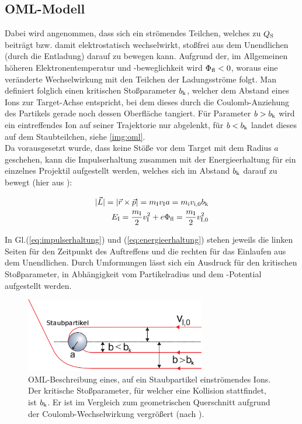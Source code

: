     \subsection{OML-Modell}\label{subsub:oml}

    Dabei wird angenommen, dass sich ein strömendes Teilchen, welches zu $Q_\text{S}$ beiträgt bzw. damit elektrostatisch wechselwirkt, stoßfrei aus dem Unendlichen (durch die Entladung) darauf zu bewegen kann. Aufgrund der, im Allgemeinen höheren Elektronentemperatur und -beweglichkeit wird $\Phi_\text{fl}<0$, woraus eine veränderte Wechselwirkung mit den Teilchen der Ladungsströme folgt. Man definiert folglich einen kritischen Stoßparameter $b_\text{k}$, welcher dem Abstand eines Ions zur Target-Achse entspricht, bei dem dieses durch die Coulomb-Anziehung des Partikels gerade noch dessen Oberfläche tangiert. Für Parameter $b>b_\text{k}$ wird ein eintreffendes Ion auf seiner Trajektorie nur abgelenkt, für $b<b_\text{k}$ landet dieses auf dem Staubteilchen, siehe \autoref{img:oml}.\\
    Da vorausgesetzt wurde, dass keine Stöße vor dem Target mit dem Radius $a$ geschehen, kann die Impulserhaltung zusammen mit der Energieerhaltung für ein einzelnes Projektil aufgestellt werden, welches sich im Abstand $b_\text{k}$ darauf zu bewegt (hier aus \cite{Melzer12}):

      \begin{align}
        |\vec{L}|=|\vec{r}\times\vec{p}|=m_\text{I}v_\text{I}a=m_\text{i}v_\text{i,0}b_\text{k} \label{eq:impulserhaltung} \\
        E_\text{I}=\frac{m_\text{I}}{2}v_\text{I}^2+e\Phi_\text{fl}=\frac{m_\text{I}}{2}v_\text{I,0}^2 \label{eq:energieerhaltung}
      \end{align}

    In Gl.(\ref{eq:impulserhaltung}) und (\ref{eq:energieerhaltung}) stehen jeweils die linken Seiten für den Zeitpunkt des Auftreffens und die rechten für das Einlaufen aus dem Unendlichen. Durch Umformungen lässt sich ein Ausdruck für den kritischen Stoßparameter, in Abhängigkeit vom Partikelradius und dem -Potential aufgestellt werden.

          \begin{figure}[!t]
            \centering
            \includegraphics[width=0.7\textwidth, height=0.3\textwidth]{figs/orbitalmotionlimitmelzer.png}
            \caption{OML-Beschreibung eines, auf ein Staubpartikel einströmendes Ions. Der kritische Stoßparameter, für welcher eine Kollision stattfindet, ist $b_\text{k}$. Er ist im Vergleich zum geometrischen Querschnitt aufgrund der Coulomb-Wechselwirkung vergrößert (nach \cite{Melzer12}).}
            \label{img:oml}
          \end{figure}

